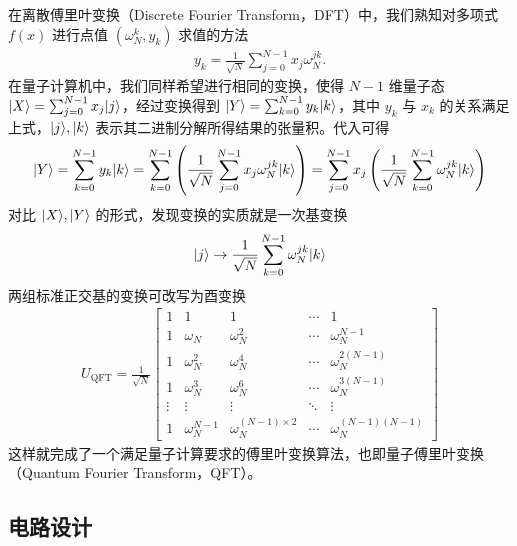 在离散傅里叶变换（Discrete Fourier Transform，DFT）中，我们熟知对多项式 $f(x)$ 进行点值 $(\omega_N^k,y_k)$ 求值的方法 \begin{align}
    y_k=\frac{1}{\sqrt{N}}\sum_{j=0}^{N-1}x_j\omega_N^{jk}.
\end{align}
在量子计算机中，我们同样希望进行相同的变换，使得 $N-1$ 维量子态 $|X\rangle=\sum_{j=0}^{N-1}x_j|j\rangle$，经过变换得到 $|Y\rangle=\sum_{k=0}^{N-1}y_k|k\rangle$，其中 $y_k$ 与 $x_k$ 的关系满足上式，$|j\rangle,|k\rangle$ 表示其二进制分解所得结果的张量积。代入可得 \begin{align}
    |Y\rangle=\sum_{k=0}^{N-1}y_k|k\rangle=\sum_{k=0}^{N-1}\left(\frac{1}{\sqrt{N}}\sum_{j=0}^{N-1}x_j\omega_N^{jk}|k\rangle\right)=\sum_{j=0}^{N-1}x_j\left(\frac{1}{\sqrt{N}}\sum_{k=0}^{N-1}\omega_N^{jk}|k\rangle\right)
\end{align}
对比 $|X\rangle,|Y\rangle$ 的形式，发现变换的实质就是一次基变换 \begin{align}
    |j\rangle\to\frac{1}{\sqrt{N}}\sum_{k=0}^{N-1}\omega_N^{jk}|k\rangle\label{eq:qft-change-basis}
\end{align}
两组标准正交基的变换可改写为酉变换 \begin{align}
    U_{\text{QFT}} = \frac{1}{\sqrt{N}}
    \begin{bmatrix}
        1      & 1               & 1                         & \cdots & 1                      \\
        1      & \omega_N        & \omega_N ^{2}             & \cdots & \omega_N ^{N-1}        \\
        1      & \omega_N ^{2}   & \omega_N ^{4}             & \cdots & \omega_N ^{2(N-1)}     \\
        1      & \omega_N ^{3}   & \omega_N ^{6}             & \cdots & \omega_N ^{3(N-1)}     \\
        \vdots & \vdots          & \vdots                    & \ddots & \vdots                 \\
        1      & \omega_N ^{N-1} & \omega_N ^{(N-1)\times 2} & \cdots & \omega_N ^{(N-1)(N-1)}
    \end{bmatrix}
\end{align}
这样就完成了一个满足量子计算要求的傅里叶变换算法，也即量子傅里叶变换（Quantum Fourier Transform，QFT）。

\subsection{电路设计}

